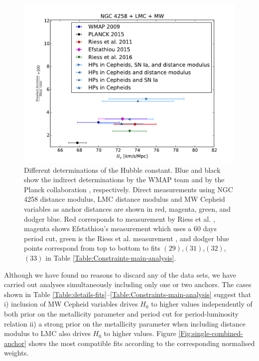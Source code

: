 \begin{figure}[hbtp]
\centering
\includegraphics[width=\textwidth]{figures/chapter-h0/H0_values_three_anchors.pdf}
\caption{Different determinations of the Hubble constant. Blue and black show the indirect determinations by the WMAP team \cite{Hinshaw:2012aka} and by the Planck collaboration \cite{Ade:2015xua}, respectively. Direct measurements using NGC 4258 distance modulus, LMC distance modulus and MW Cepheid variables as anchor distances are shown in red, magenta, green, and dodger blue. Red corresponds to measurement by Riess et al. \cite{Riess:2011yx}, magenta shows Efstathiou's measurement \cite{Efstathiou:2013via} which uses a $60$ days period cut, green is the Riess et al. measurement \cite{Riess:2016jrr}, and dodger blue points correspond from top to bottom to fits $(29)$,$(31)$,$(32)$, $(33)$ in Table \ref{Table:Constraints-main-analysis}.\label{Fig:H0-values-3-anchors}}
\end{figure}

Although we have found no reasons to discard any of the data sets, we have carried out analyses simultaneously including only one or two anchors. The cases shown in Table \ref{Table:details-fits}--\ref{Table:Constraints-main-analysis} suggest that i) inclusion of MW Cepheid variables drives $H_0$ to higher values independently of both prior on the metallicity parameter and period cut for period-luminosity relation ii) a strong prior on the metallicity parameter when including distance modulus to LMC also drives $H_0$ to higher values. Figure \ref{Fig:single-combined-anchor} shows the most compatible fits according to the corresponding normalised weights. 
 
